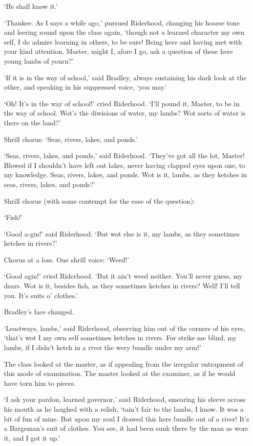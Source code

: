 ‘He shall know it.’

‘Thankee. As I says a while ago,’ pursued Riderhood, changing his hoarse
tone and leering round upon the class again, ‘though not a learned
character my own self, I do admire learning in others, to be sure! Being
here and having met with your kind attention, Master, might I, afore I
go, ask a question of these here young lambs of yourn?’

‘If it is in the way of school,’ said Bradley, always sustaining his
dark look at the other, and speaking in his suppressed voice, ‘you may.’

‘Oh! It’s in the way of school!’ cried Riderhood. ‘I’ll pound it,
Master, to be in the way of school. Wot’s the diwisions of water, my
lambs? Wot sorts of water is there on the land?’

Shrill chorus: ‘Seas, rivers, lakes, and ponds.’

‘Seas, rivers, lakes, and ponds,’ said Riderhood. ‘They’ve got all the
lot, Master! Blowed if I shouldn’t have left out lakes, never having
clapped eyes upon one, to my knowledge. Seas, rivers, lakes, and ponds.
Wot is it, lambs, as they ketches in seas, rivers, lakes, and ponds?’

Shrill chorus (with some contempt for the ease of the question):

‘Fish!’

‘Good a-gin!’ said Riderhood. ‘But wot else is it, my lambs, as they
sometimes ketches in rivers?’

Chorus at a loss. One shrill voice: ‘Weed!’

‘Good agin!’ cried Riderhood. ‘But it ain’t weed neither. You’ll never
guess, my dears. Wot is it, besides fish, as they sometimes ketches in
rivers? Well! I’ll tell you. It’s suits o’ clothes.’

Bradley’s face changed.

‘Leastways, lambs,’ said Riderhood, observing him out of the corners
of his eyes, ‘that’s wot I my own self sometimes ketches in rivers. For
strike me blind, my lambs, if I didn’t ketch in a river the wery bundle
under my arm!’

The class looked at the master, as if appealing from the irregular
entrapment of this mode of examination. The master looked at the
examiner, as if he would have torn him to pieces.

‘I ask your pardon, learned governor,’ said Riderhood, smearing his
sleeve across his mouth as he laughed with a relish, ‘tain’t fair to the
lambs, I know. It wos a bit of fun of mine. But upon my soul I drawed
this here bundle out of a river! It’s a Bargeman’s suit of clothes. You
see, it had been sunk there by the man as wore it, and I got it up.’

